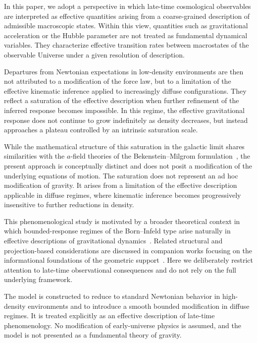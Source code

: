   In this paper, we adopt a perspective in which late-time cosmological observables
  are interpreted as effective quantities arising from a coarse-grained description
  of admissible macroscopic states.
  Within this view, quantities such as gravitational acceleration or the Hubble
  parameter are not treated as fundamental dynamical variables.
  They characterize effective transition rates between macrostates of the
  observable Universe under a given resolution of description.

  Departures from Newtonian expectations in low-density environments are then not
  attributed to a modification of the force law, but to a limitation of the
  effective kinematic inference applied to increasingly diffuse configurations.
  They reflect a saturation of the effective description when further refinement
  of the inferred response becomes impossible.
  In this regime, the effective gravitational response does not continue to grow
  indefinitely as density decreases, but instead approaches a plateau controlled
  by an intrinsic saturation scale.

  While the mathematical structure of this saturation in the galactic limit
  shares similarities with the $a$-field theories of the Bekenstein--Milgrom
  formulation~\cite{Bekenstein1984}, the present approach is conceptually distinct
  and does not posit a modification of the underlying equations of motion.
  The saturation does not represent an ad hoc modification of gravity.
  It arises from a limitation of the effective description applicable in diffuse
  regimes, where kinematic inference becomes progressively insensitive to further
  reductions in density.

  This phenomenological study is motivated by a broader theoretical context in
  which bounded-response regimes of the Born--Infeld type arise naturally in
  effective descriptions of gravitational dynamics~\cite{Beau2026c}.
  Related structural and projection-based considerations are discussed in
  companion works focusing on the informational foundations of the geometric
  support~\cite{Beau2026a,Beau2026b}.
  Here we deliberately restrict attention to late-time observational consequences
  and do not rely on the full underlying framework.

  The model is constructed to reduce to standard Newtonian behavior in
  high-density environments and to introduce a smooth bounded modification in
  diffuse regimes.
  It is treated explicitly as an effective description of late-time
  phenomenology.
  No modification of early-universe physics is assumed, and the model is not
  presented as a fundamental theory of gravity.

